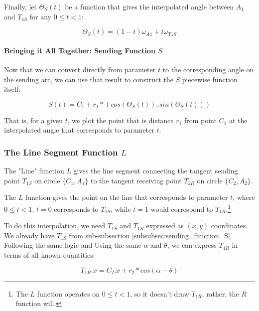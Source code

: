 \documentclass{article}
\begin{document}
Finally, let $\Theta_S(t)$ be a function that gives the interpolated angle between $A_1$ and $T_{1S}$ for any $0 \leq t < 1$:

\begin{equation}
    \label{eq:Theta_S(t)}
    \Theta_S(t) = (1-t) \omega_{A1} + t \omega_{T1S}
\end{equation}

\paragraph{Bringing it All Together: Sending Function $S$}
Now that we can convert directly from parameter $t$ to the corresponding angle on the sending arc, we can use that result to construct the $S$ piecewise function itself:

\begin{equation}
    \label{eq:S(t)}
    S(t) = C_1 + r_1 * (cos( \Theta_S(t) ), sin( \Theta_S(t) ))
\end{equation}

That is, for a given $t$, we plot the point that is distance $r_1$ from point $C_1$ at the interpolated angle that corresponds to parameter $t$.


\subsubsection{The Line Segment Function $L$}
\label{subsubsec:line_segment_function_L}
The "Line" function $L$ gives the line segment connecting the tangent sending point $T_{1S}$ on circle $\{C_1, A_1\}$ to the tangent receiving point $T_{2R}$ on circle $\{C_2, A_2\}$.

The $L$ function gives the point on the line that corresponds to parameter $t$, where $0 \leq t < 1$. $t = 0$ corresponds to $T_{1S}$, while $t = 1$ would correspond to $T_{1R}$.\footnote{The $L$ function operates on $0 \leq t < 1$, so it doesn't draw $T_{1R}$, rather, the $R$ function will.}

To do this interpolation, we need $T_{1S}$ and $T_{1R}$ expressed as $(x,y)$ coordinates. We already have $T_{1S}$ from sub-subsection \ref{subsubsec:sending_function_S}. Following the same logic and Using the same $\alpha$ and $\theta$, we can express $T_{1R}$ in terms of all known quantities:

\begin{equation}
    \label{eq:T_1R.x}
    T_{1R}.x = C_2.x + r_2 * cos(\alpha - \theta)
\end{equation}
\end{document}
